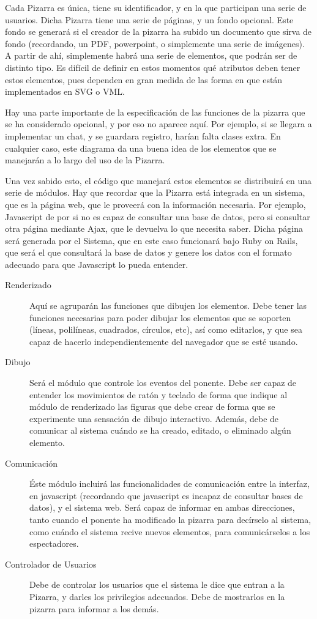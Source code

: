 Cada Pizarra es única, tiene su identificador, y en la que participan una serie de usuarios. Dicha Pizarra tiene una serie de páginas, y un fondo opcional. Este fondo se generará si el creador de la pizarra ha subido un documento que sirva de fondo (recordando, un PDF, powerpoint, o simplemente una serie de imágenes). A partir de ahí, simplemente habrá una serie de elementos, que podrán ser de distinto tipo. Es difícil de definir en estos momentos qué atributos deben tener estos elementos, pues dependen en gran medida de las forma en que están implementados en SVG o VML.

Hay una parte importante de la especificación de las funciones de la pizarra que se ha considerado opcional, y por eso no aparece aquí. Por ejemplo, si se llegara a implementar un chat, y se guardara registro, harían falta clases extra. En cualquier caso, este diagrama da una buena idea de los elementos que se manejarán a lo largo del uso de la Pizarra.

Una vez sabido esto, el código que manejará estos elementos se distribuirá en una serie de módulos. Hay que recordar que la Pizarra está integrada en un sistema, que es la página web, que le proveerá con la información necesaria. Por ejemplo, Javascript de por si no es capaz de consultar una base de datos, pero si consultar otra página mediante Ajax, que le devuelva lo que necesita saber. Dicha página será generada por el Sistema, que en este caso funcionará bajo Ruby on Rails, que será el que consultará la base de datos y genere los datos con el formato adecuado para que Javascript lo pueda entender.

\begin{description}
	\item[Renderizado] Aquí se agruparán las funciones que dibujen los elementos. Debe tener las funciones necesarias para poder dibujar los elementos que se soporten (líneas, polilíneas, cuadrados, círculos, etc), así como editarlos, y que sea capaz de hacerlo independientemente del navegador que se esté usando.
	\item[Dibujo] Será el módulo que controle los eventos del ponente. Debe ser capaz de entender los movimientos de ratón y teclado de forma que indique al módulo de renderizado las figuras que debe crear de forma que se experimente una sensación de dibujo interactivo. Además, debe de comunicar al sistema cuándo se ha creado, editado, o eliminado algún elemento.
	\item[Comunicación] Éste módulo incluirá las funcionalidades de comunicación entre la interfaz, en javascript (recordando que javascript es incapaz de consultar bases de datos), y el sistema web. Será capaz de informar en ambas direcciones, tanto cuando el ponente ha modificado la pizarra para decírselo al sistema, como cuándo el sistema recive nuevos elementos, para comunicárselos a los espectadores.
	\item[Controlador de Usuarios] Debe de controlar los usuarios que el sistema le dice que entran a la Pizarra, y darles los privilegios adecuados. Debe de mostrarlos en la pizarra para informar a los demás.
\end{description}

